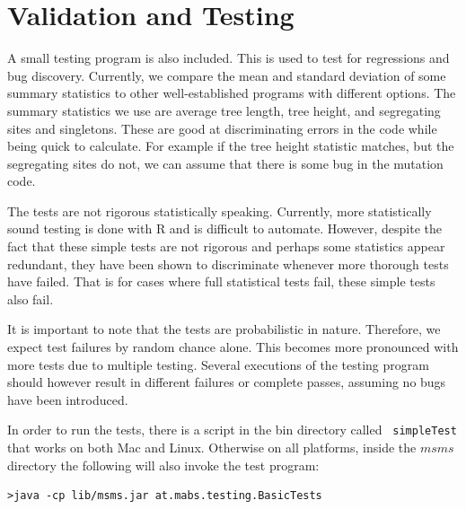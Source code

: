 \documentclass{article}
\begin{document}
\section{Validation and Testing}

A small testing program is also included. This is used to test for regressions
and bug discovery. Currently, we compare the mean and standard deviation of some
summary statistics to other well-established programs with different options.
The summary statistics we use are average tree length, tree height, and
segregating sites and singletons. These are good at discriminating errors in the
code while being quick to calculate. For example if the tree height statistic
matches, but the segregating sites do not, we can assume that there is some bug
in the mutation code.

The tests are not rigorous statistically speaking. Currently, more statistically
sound testing is done with R and is difficult to automate. However, despite the
fact that these simple tests are not rigorous and perhaps some statistics appear
redundant, they have been shown to discriminate whenever more thorough tests
have failed. That is for cases where full statistical tests fail, these simple
tests also fail.

It is important to note that the tests are probabilistic in nature. Therefore,
we expect test failures by random chance alone. This becomes more pronounced with
more tests due to multiple testing. Several executions of the testing
program should however result in different failures or complete passes,
assuming no bugs have been introduced. 

In order to run the tests, there is a script in the bin directory called {\tt
simpleTest} that works on both Mac and Linux. Otherwise on all platforms,
inside the $msms$ directory the following will also invoke the test program:
\begin{verbatim}
>java -cp lib/msms.jar at.mabs.testing.BasicTests
\end{verbatim}



 
 
\end{document}
